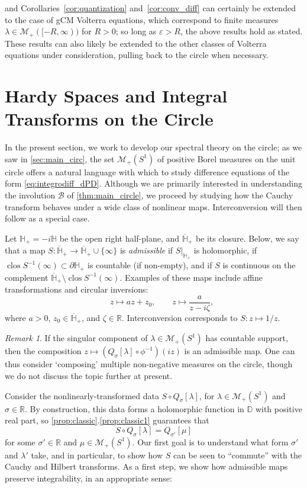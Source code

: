 \documentclass{cams-l} %
\newcommand{\dave}[1]{#1}\newcommand{\davebegin}{}\newcommand{\daveend}{}\newcommand{\george}[1]{#1}
\newcommand{\RR}{\mathbb R}
\newcommand{\HH}{\mathbb H}
\newcommand{\DD}{\mathbb D}
\newcommand{\cM}{\mathcal M}
\newcommand{\cB}{\mathcal B}
\newcommand{\eps}{\varepsilon}
\newcommand{\ovl}[1]{{\overline{#1}}}
\newcommand{\op}{\operatorname}
\theoremstyle{definition}
\theoremstyle{remark}
\newtheorem{remark}[theorem]{Remark}
\numberwithin{equation}{section}
\begin{document}
 and Corollaries~\ref{cor:quantization} and~\ref{cor:conv_diff} can certainly be extended to the case of gCM Volterra equations, which correspond to finite measures $\lambda\in\cM_+([-R,\infty))$ for $R>0$; so long as $\eps> R$, the above results hold as stated. These results can also likely be extended to the other classes of Volterra equations under consideration, \dave{pulling back to the circle when necessary}. 
\section{Hardy Spaces and Integral Transforms on the Circle}\label{sec:disc}
In the present section, we work to develop our spectral theory on the circle; as we saw in \cref{sec:main_circ}, the set $\cM_+(S^1)$ of positive Borel measures on the unit circle offers a natural language with which to study difference equations of the form \ref{eq:integrodiff_dPD}. Although we are primarily interested in understanding the involution $\cB$ of \cref{thm:main_circle}, we proceed by studying how the Cauchy transform behaves under a wide class of nonlinear maps. Interconversion will then follow as a special case.

Let $\HH_+ = -i\HH$ be the open right half-plane, and $\ovl{\HH}_+$ be its closure. Below, we say that a map $S:\ovl{\HH}_+\to \ovl{\HH}_+\cup\{\infty\}$ is \emph{admissible} if $S|_{\HH_+}$ is holomorphic, if $\op{clos}S^{-1}(\infty)\subset\partial \HH_+$ is countable (if non-empty), and if $S$ is continuous on the complement $\ovl{\HH}_+\setminus \op{clos}S^{-1}(\infty)$. Examples of these maps include affine transformations and circular inversions:
\[\qquad z\mapsto az + z_0,\qquad z\mapsto \frac{a}{z-i\zeta},\]
where $a>0$, $z_0\in \ovl{\HH}_+$, and $\zeta\in\RR$. Interconversion corresponds to $S:z\mapsto 1/z$.

\begin{remark}\label{rem:map_algebra}
If the singular component of $\lambda\in\cM_+(S^1)$ has countable support, then the composition $z\mapsto(Q_\sigma[\lambda]\circ\phi^{-1})(iz)$ is an admissible map. One can \dave{thus consider `composing' multiple non-negative measures on the circle, though we do not discuss the topic further at present.}
\end{remark}

Consider the nonlinearly-transformed data $S\circ Q_\sigma[\lambda]$, for $\lambda\in\cM_+(S^1)$ and $\sigma\in\RR$. By construction, this data forms a holomorphic function in $\DD$ with positive real part, so \cref{prop:classic}.\ref{prop:classic1} guarantees that
\[S\circ Q_\sigma[\lambda] = Q_{\sigma'}[\mu]\]
for some $\sigma'\in\RR$ and $\mu\in\cM_+(S^1)$. Our first goal is to understand what form $\sigma'$ and $\lambda'$ take, and in particular, to show how $S$ can be seen to ``commute'' with the Cauchy and Hilbert transforms. As a first step, we show how admissible maps preserve integrability, in an appropriate sense:
\end{document}

